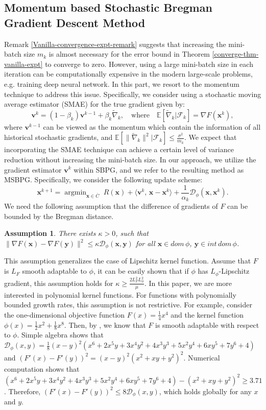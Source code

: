 \documentclass[twoside,11pt]{article}
\newcommand{\be}{\begin{equation}}
\newcommand{\ee}{\end{equation}}
\newcommand{\E}{\mathbb{E}}
\newcommand{\cD}{\mathcal D}
\newcommand{\cF}{\mathcal F}
\DeclareMathOperator*{\argmin}{argmin}
\def\inprod#1#2{\langle#1,\,#2\rangle}
\newtheorem{assumption}{Assumption}%
\def\vv{{\bm{v}}}
\def\vx{{\bm{x}}}
\def\vy{{\bm{y}}}
\begin{document}
\subsection{Momentum based Stochastic Bregman Gradient Descent Method}
Remark \ref{Vanilla-convergence-expt-remark} suggests that increasing the mini-batch size $m_k$ is almost necessary for the error bound in Theorem \ref{converge-thm-vanilla-expt} to converge to zero. However, using a large mini-batch size in each iteration can be computationally expensive in the modern large-scale problems, e.g. training deep neural network. In this part, we resort to the momentum technique to address this issue. Specifically, we consider using a stochastic moving average estimator (SMAE) for the true gradient given by:
\be
\vv^k=(1-\beta_k)\vv^{k-1}+\beta_k\widetilde\nabla_k,\quad \mbox{where}\quad \E[\widetilde\nabla_k|\cF_k]=\nabla F({\vx^k}),
\label{SMAE}
\ee
where $\vv^{k-1}$ can be viewed as the momentum which contain the information of all historical stochastic gradients, and $\E[\|\widetilde\nabla_k\|^2|\cF_k]\leq\frac{\sigma^2}{m_k}$. We expect that incorporating the SMAE technique can achieve a certain level of variance reduction without increasing the mini-batch size. In our approach, we utilize the gradient estimator $\vv^k$ within SBPG, and we refer to the resulting method as MSBPG. Specifically, we consider the following update scheme:
\begin{equation}
{\vx^{k+1}}=\argmin_{\vx\in\overline{C}}\;R(\vx)+\inprod{\vv^k}{\vx-{\vx^k}}+\frac{1}{\alpha_k}\cD_\phi(\vx,{\vx^k}).
\label{momentum-SBPG}
\end{equation}
We need the following assumption that the difference of gradients of $F$ can be bounded by the Bregman distance. 
\begin{assumption}\label{momentum-assumption}
 There exists $\kappa>0$, such that $\|\nabla F(\vx)-\nabla F(\vy)\|^2\leq\kappa \cD_\phi(\vx,\vy)$ for all $\vx\in dom\,\phi$, $\vy\in int\,dom\,\phi$.   
\end{assumption}
\begin{remark}
  This assumption generalizes the {case of Lipschitz kernel function.} Assume that $F$ is $L_F$ smooth adaptable to $\phi$, it can be easily shown that if $\phi$ has $L_\phi$-Lipschitz gradient, this assumption holds for $\kappa\geq\frac{2L_F^2L_\phi^2}{\mu}$. In this paper, we are more interested in polynomial kernel functions. For functions with polynomially bounded growth rates, this assumption is not restrictive. For example, consider the one-dimensional objective function $F(x)=\frac{1}{4}x^4$ and the kernel function $\phi(x)=\frac{1}{2}x^2+\frac{1}{8}x^8$. Then, by \cite[Proposition 2.1]{lu2018relatively}, we know that $F$ is smooth adaptable with respect to $\phi$. Simple algebra shows that $\cD_\phi(x,y)=\frac{1}{8}(x-y)^2(x^6 + 2 x^5 y + 3 x^4 y^2 + 4 x^3 y^3 + 5 x^2 y^4 + 6 x y^5 + 7 y^6 + 4)$ and $(F'(x)-F'(y))^2=(x-y)^2(x^2+xy+y^2)^2$. Numerical computation shows that $(x^6 + 2 x^5 y + 3 x^4 y^2 + 4 x^3 y^3 + 5 x^2 y^4 + 6 x y^5 + 7 y^6 + 4)-(x^2+xy+y^2)^2\geq3.71$. Therefore, $(F'(x)-F'(y))^2\leq8\cD_\phi(x,y)$, which holds globally
  {for any $x$ and $y$}. 
\end{remark}
\end{document}
